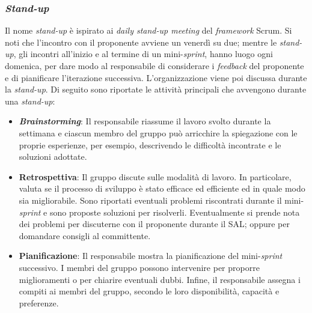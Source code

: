 \subsubsection{\textit{Stand-up}}
Il nome \textit{stand-up} è ispirato ai \textit{daily stand-up meeting} del
\textit{framework} Scrum. Si noti che l'incontro con il proponente avviene un
venerdì su due; mentre le \textit{stand-up}, gli incontri all'inizio
e al termine di un mini-\textit{sprint}, hanno luogo ogni domenica,
per dare modo al responsabile di considerare i \textit{feedback} del proponente
e di pianificare l'iterazione successiva. L'organizzazione viene poi discussa
durante la \textit{stand-up}. Di seguito sono riportate le attività principali
che avvengono durante una \textit{stand-up}:

\begin{itemize}
	\item \textbf{\textit{Brainstorming}}: Il responsabile riassume il lavoro
	      svolto durante la settimana e ciascun membro del gruppo può arricchire
	      la spiegazione con le proprie esperienze, per esempio, descrivendo le
	      difficoltà incontrate e le soluzioni adottate.

	\item \textbf{Retrospettiva}: Il gruppo discute sulle modalità di
	      lavoro. In particolare, valuta se il processo di sviluppo è stato
	      efficace ed efficiente ed in quale modo sia migliorabile. Sono
	      riportati eventuali problemi riscontrati durante il
	      mini-\textit{sprint} e sono proposte soluzioni per risolverli.
	      Eventualmente si prende nota dei problemi per discuterne con il
	      proponente durante il SAL; oppure per domandare consigli al
	      committente.

	\item \textbf{Pianificazione}: Il responsabile mostra la pianificazione del
	      mini-\textit{sprint} successivo. I membri del gruppo possono
	      intervenire per proporre miglioramenti o per chiarire eventuali dubbi.
	      Infine, il responsabile assegna i compiti ai membri del gruppo,
	      secondo le loro disponibilità, capacità e preferenze.
\end{itemize}

